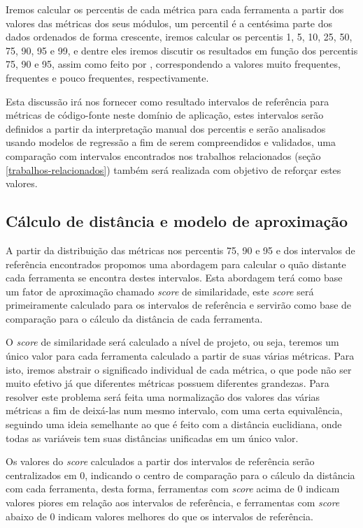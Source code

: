 Iremos calcular os percentis de cada métrica para cada ferramenta a partir dos
valores das métricas dos seus módulos, um percentil é a centésima parte dos
dados ordenados de forma crescente, iremos calcular os percentis 1, 5, 10, 25,
50, 75, 90, 95 e 99, e dentre eles iremos discutir os resultados em função dos
percentis 75, 90 e 95, assim como feito por ,
correspondendo a valores muito frequentes, frequentes e pouco frequentes,
respectivamente.

Esta discussão irá nos fornecer como resultado intervalos de referência para
métricas de código-fonte neste domínio de aplicação, estes intervalos serão
definidos a partir da interpretação manual dos percentis e serão analisados
usando modelos de regressão a fim de serem compreendidos e validados, uma
comparação com intervalos encontrados nos trabalhos relacionados (seção
\ref{trabalhos-relacionados}) também será realizada com objetivo de reforçar
estes valores.

\subsection{Cálculo de distância e modelo de aproximação} \label{distancia}

A partir da distribuição das métricas nos percentis 75, 90 e 95 e dos
intervalos de referência encontrados propomos uma abordagem para calcular o
quão distante cada ferramenta se encontra destes intervalos.  Esta abordagem
terá como base um fator de aproximação chamado {\it score} de similaridade,
este {\it score} será primeiramente calculado para os intervalos de referência
e servirão como base de comparação para o cálculo da distância de cada
ferramenta.

O {\it score} de similaridade será calculado a nível de projeto, ou seja,
teremos um único valor para cada ferramenta calculado a partir de suas várias
métricas. Para isto, iremos abstrair o significado individual de cada métrica,
o que pode não ser muito efetivo já que diferentes métricas possuem diferentes
grandezas. Para resolver este problema será feita uma normalização dos valores
das várias métricas a fim de deixá-las num mesmo intervalo, com uma certa
equivalência, seguindo uma ideia semelhante ao que é feito com a distância
euclidiana, onde todas as variáveis tem suas distâncias unificadas em um único
valor.

Os valores do {\it score} calculados a partir dos intervalos de referência
serão centralizados em 0, indicando o centro de comparação para o cálculo da
distância com cada ferramenta, desta forma, ferramentas com {\it score} acima
de 0 indicam valores piores em relação aos intervalos de referência, e
ferramentas com {\it score} abaixo de 0 indicam valores melhores do que os
intervalos de referência.

